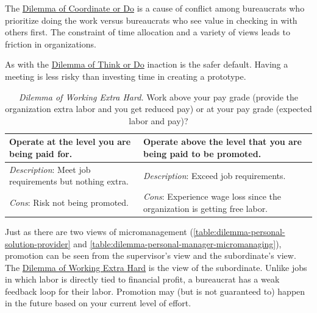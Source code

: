 The \hyperref[table:dilemma-personal-meetings-versus-work]{Dilemma of Coordinate or Do} is a cause of conflict among bureaucrats who prioritize doing the work versus bureaucrats who see value in checking in with others first. The constraint of time allocation and a variety of views leads to friction in organizations.

As with the \hyperref[table:dilemma-personal-forest-vs-trees]{Dilemma of Think or Do}\iftoggle{printedonpaper}{ (\ref{table:dilemma-personal-forest-vs-trees}),}{,} 
inaction is the safer default. Having a meeting is less risky than investing time in creating a prototype. 

\begin{center}
\begin{table}[H] %
\begin{tabular}{ | m{\dilemmatablewidth}| m{\dilemmatablewidth} | } 
  \hline
  \textbf{Operate at the level you are being paid for.} &
  \textbf{Operate above the level that you are being paid  to be promoted.} \\
  \hline
  \textit{Description}: Meet job requirements but nothing extra. &
  \textit{Description}: Exceed job requirements. \\
  \hline
  \textit{Cons}: Risk not being promoted. & 
  \textit{Cons}: Experience wage loss since the organization is getting free labor. \\
  \hline
\end{tabular}
\caption{\textit{Dilemma of Working Extra Hard.}
Work above your pay grade (provide the organization extra labor and you get reduced pay) or at your pay grade (expected labor and pay)?
}
\label{table:dilemma-personal-work-extra-or-work-as-expected}
\end{table}
\end{center}

Just as there are two views of micromanagement (\ref{table:dilemma-personal-solution-provider} and \ref{table:dilemma-personal-manager-micromanaging}), promotion can be seen from the supervisor's view and the subordinate's view. The \hyperref[table:dilemma-personal-work-extra-or-work-as-expected]{Dilemma of Working Extra Hard} 
\iftoggle{printedonpaper}{ (\ref{table:dilemma-personal-work-extra-or-work-as-expected})}{} is 
the view of the subordinate. Unlike jobs in which labor is directly tied to financial profit, a bureaucrat has a weak feedback loop for their labor. Promotion may (but is not guaranteed to) happen in the future based on your current level of effort. 

